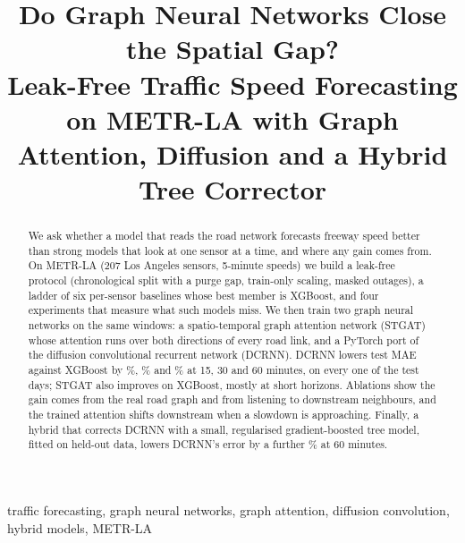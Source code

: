 \documentclass[conference]{IEEEtran}
\begin{document}
\title{Do Graph Neural Networks Close the Spatial Gap?\\
Leak-Free Traffic Speed Forecasting on METR-LA with Graph Attention, Diffusion and a Hybrid Tree Corrector}

\author{
}

\maketitle

\begin{abstract}
We ask whether a model that reads the road network forecasts freeway speed better than strong models that look at one
sensor at a time, and where any gain comes from. On METR-LA (207 Los Angeles sensors, 5-minute speeds) we build a
leak-free protocol (chronological split with a purge gap, train-only scaling, masked outages), a ladder of six
per-sensor baselines whose best member is XGBoost, and four experiments that measure what such models miss. We then
train two graph neural networks on the same windows: a spatio-temporal graph attention network (STGAT) whose attention
runs over both directions of every road link, and a PyTorch port of the diffusion convolutional recurrent network
(DCRNN). DCRNN lowers test MAE against XGBoost by \DcrnnGainFifteen\%, \DcrnnGainThirty\% and \DcrnnGainSixty\% at 15,
30 and 60 minutes, on every one of the \TestDays{} test days; STGAT also improves on XGBoost, mostly at short horizons.
Ablations show the gain comes from the real road graph and from listening to downstream neighbours, and the trained
attention shifts downstream when a slowdown is approaching. Finally, a hybrid that corrects DCRNN with a small,
regularised gradient-boosted tree model, fitted on held-out data, lowers DCRNN's error by a further
\HybridOverDcrnnSixty\% at 60 minutes.
\end{abstract}

\begin{IEEEkeywords}
traffic forecasting, graph neural networks, graph attention, diffusion convolution, hybrid models, METR-LA
\end{IEEEkeywords}
\end{document}
